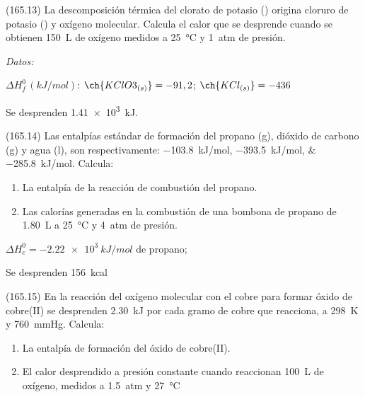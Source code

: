 \documentclass[10pt,a5paper,twoside]{article}
\newenvironment{gexdatos}{
      \vspace{4pt}
      \noindent\small\textit{Datos:}
    }{\vspace{5pt}}
\begin{document}
  \begin{exercise}[
      tags    = {},
      topics  = {química, termodinámica, termoquímica},
      source  = {FQ 1B MGH 2016, p165, e13},
    ]
    (165.13) La descomposición térmica del clorato de potasio ()
    origina cloruro de potasio () y oxígeno molecular. Calcula
    el calor que se desprende cuando se obtienen \SI{150}{\liter} de
    oxígeno medidos a \SI{25}{\celsius} y \SI{1}{atm} de presión.

    \begin{gexdatos}
      \( \Delta H^0_f\,(\si{kJ/mol}) \): \( \ch{KClO3_{(s)}} = -91,2 \); \( \ch{KCl_{(s)}} = -436 \)
    \end{gexdatos}
  \end{exercise}

  \begin{solution}
    Se desprenden \SI{1.41e3}{kJ}.
  \end{solution}




  \begin{exercise}[
      tags    = {},
      topics  = {química, termodinámica, termoquímica},
      source  = {FQ 1B MGH 2016, p165, e6},
    ]
    (165.14) Las entalpías estándar de formación del propano (g),
    dióxido de carbono (g) y agua (l), son respectivamente:
    \SIlist{-103,8;-393,5;-285,8}{kJ/mol}. Calcula:
    \begin{enumerate}
      \item La entalpía de la reacción de combustión del propano.
      \item Las calorías generadas en la combustión de una bombona de propano de \SI{1.80}{\liter} a \SI{25}{\celsius} y \SI{4}{atm} de presión.
    \end{enumerate}
  \end{exercise}

  \begin{solution}
    \begin{enumerate*}
      \item \( \Delta H^0_c = \SI{-2.22e3}{kJ/mol} \) de propano;
      \item Se desprenden \SI{156}{kcal}
    \end{enumerate*}
  \end{solution}




  \begin{exercise}[
      tags    = {},
      topics  = {química, termodinámica, termoquímica},
      source  = {FQ 1B MGH 2016, p165, e15},
    ]
    (165.15) En la reacción del oxígeno molecular con el cobre para formar
    óxido de cobre(II) se desprenden \SI{2.30}{kJ} por cada gramo de
    cobre que reacciona, a \SI{298}{\kelvin} y \SI{760}{\mmHg}. Calcula:
    \begin{enumerate}
      \item La entalpía de formación del óxido de cobre(II).
      \item El calor desprendido a presión constante cuando reaccionan \SI{100}{\liter} de oxígeno, medidos a \SI{1.5}{atm} y \SI{27}{\celsius}
    \end{enumerate}
  \end{exercise}
\end{document}
